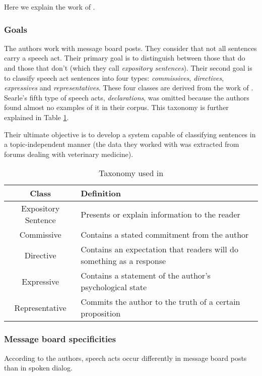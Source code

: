 \documentclass[11pt]{article}
\begin{document}
Here we explain the work of \cite{qadir2011classifying}.

\subsubsection{Goals}

The authors work with message board posts. They consider that not all sentences carry a speech act. Their primary goal is to distinguish between those that do and those that don't (which they call \textit{expository sentences}). Their second goal is to classify speech act sentences into four types: \textit{commissives}, \textit{directives}, \textit{expressives} and \textit{representatives}. These four classes are derived from the work of \cite{searle1976taxonomy}. Searle's fifth type of speech acts, \textit{declarations}, was omitted because the authors found almost no examples of it in their corpus. This taxonomy is further explained in Table \ref{fig:qadirTaxonomies}.

Their ultimate objective is to develop a system capable of classifying sentences in a topic-independent manner (the data they worked with was extracted from forums dealing with veterinary medicine).

\begin{table}
	\begin{tabularx}{\textwidth}{c l}
		\toprule
		Class & Definition \\
		\midrule
		Expository Sentence & Presents or explain information to the reader \\
		\midrule
		Commissive & Contains a stated commitment from the author \\
		Directive & Contains an expectation that readers will do something as a response \\
		Expressive & Contains a statement of the author's psychological state \\
		Representative & Commits the author to the truth of a certain proposition \\
		\bottomrule
	\end{tabularx}
	\caption{Taxonomy used in \cite{qadir2011classifying}}
	\label{fig:qadirTaxonomies}
\end{table}

\subsubsection{Message board specificities}

According to the authors, speech acts occur differently in message board posts than in spoken dialog. 
\end{document}
